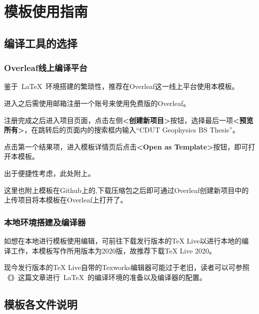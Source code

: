 \chapter{模板使用指南}

\section{编译工具的选择}

\subsection{Overleaf线上编译平台}

鉴于~\LaTeX~环境搭建的繁琐性，推荐在Overleaf这一线上平台使用本模板。

进入之后需使用邮箱注册一个账号来使用免费版的Overleaf。

注册完成之后进入项目页面，点击左侧\textbf{<创建新项目>}按钮，选择最后一项\textbf{<预览所有>}，在跳转后的页面内的搜索框内输入“CDUT Geophysics BS Thesis”。

点击第一个结果项，进入模板详情页后点击\textbf{<Open as Template>}按钮，即可打开本模板。

出于便捷性考虑，此处附上。

这里也附上模板在Github上的,下载压缩包之后即可通过Overleaf创建新项目中的上传项目将本模板在Overleaf上打开了。

\subsection{本地环境搭建及编译器}

如想在本地进行模板使用编辑，可前往下载发行版本的TeX Live以进行本地的编译工作，本模板写作所用版本为2020版，故推荐下载TeX Live 2020。

现今发行版本的TeX Live自带的Texworks编辑器可能过于老旧，读者可以可参照《》这篇文章进行~\LaTeX~的编译环境的准备以及编译器的配置。

\section{模板各文件说明}


